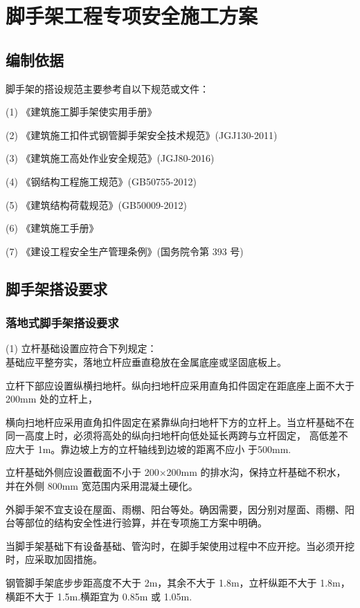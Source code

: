 \section{脚手架工程专项安全施工方案}
\subsection{编制依据}

脚手架的搭设规范主要参考自以下规范或文件：

(1) 《建筑施工脚手架使实用手册》

(2) 《建筑施工扣件式钢管脚手架安全技术规范》(JGJ130-2011)

(3) 《建筑施工高处作业安全规范》(JGJ80-2016)

(4) 《钢结构工程施工规范》(GB50755-2012)

(5) 《建筑结构荷载规范》(GB50009-2012)

(6) 《建筑施工手册》

(7) 《建设工程安全生产管理条例》(国务院令第 393 号)

\subsection{脚手架搭设要求}
\subsubsection{落地式脚手架搭设要求}

(1) 立杆基础设置应符合下列规定：\\

 基础应平整夯实，落地立杆应垂直稳放在金属底座或坚固底板上。

 立杆下部应设置纵横扫地杆。纵向扫地杆应采用直角扣件固定在距底座上面不大于 200mm 处的立杆上，

横向扫地杆应采用直角扣件固定在紧靠纵向扫地杆下方的立杆上。当立杆基础不在同一高度上时，必须将高处的纵向扫地杆向低处延长两跨与立杆固定，
高低差不应大于 1m。靠边坡上方的立杆轴线到边坡的距离不应小 于500mm.

 立杆基础外侧应设置截面不小于 200×200mm 的排水沟，保持立杆基础不积水，并在外侧 800mm 宽范围内采用混凝土硬化。

 外脚手架不宜支设在屋面、雨棚、阳台等处。确因需要，因分别对屋面、雨棚、阳台等部位的结构安全性进行验算，并在专项施工方案中明确。

 当脚手架基础下有设备基础、管沟时，在脚手架使用过程中不应开挖。当必须开挖时，应采取加固措施。

 钢管脚手架底步步距高度不大于 2m，其余不大于 1.8m，立杆纵距不大于 1.8m，横距不大于 1.5m.横距宜为 0.85m 或 1.05m.

